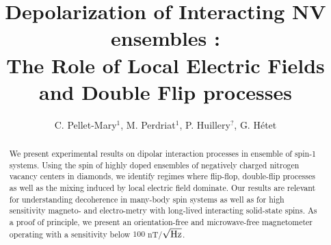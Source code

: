 \documentclass[preprintnumbers,amsmath,amssymb,superscriptaddress,twocolumn,showpacs]{revtex4-2}
\begin{document}
\title{Depolarization of Interacting NV ensembles : \\
The Role of Local Electric Fields and Double Flip processes}

\author{C. Pellet-Mary$^1$, M. Perdriat$^1$, P. Huillery$^?$,  G. H\'etet} 


\begin{abstract}
We present experimental results on dipolar interaction processes in ensemble of spin-1 systems. Using the spin of highly doped ensembles of negatively charged nitrogen vacancy centers in diamonds, we identify regimes where flip-flop, double-flip processes as well as the mixing induced by local electric field dominate.
Our results are relevant for understanding decoherence in many-body spin systems as well as for high sensitivity magneto- and electro-metry with long-lived interacting solid-state spins. As a proof of principle, we present an orientation-free and microwave-free magnetometer operating with a sensitivity below $100$ nT/$\sqrt{\rm Hz}$.
\end{abstract}

\maketitle

\end{document}
